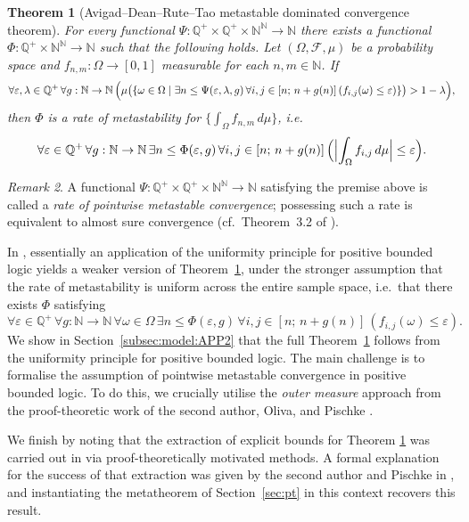 \documentclass[11pt]{amsart}
\newtheorem{theorem}{Theorem}[section]
\theoremstyle{definition}
\theoremstyle{remark}
\newtheorem{remark}[theorem]{Remark}
\def\NN{\mathbb{N}}
\def\QQ{\mathbb{Q}}
\begin{document}
\begin{theorem}[Avigad--Dean--Rute--Tao metastable dominated convergence theorem]
\label{thrm:avigad:dominated}
For every functional $\Psi\colon\QQ^+\times\QQ^+\times\NN^\NN\to\NN$ there
exists a functional $\Phi\colon\QQ^+\times\NN^\NN\to\NN$ such that the
following holds. Let $(\Omega,\mathcal{F},\mu)$ be a probability space and
$f_{n,m}\colon\Omega\to[0,1]$ measurable for each $n,m\in\NN$. If
\[
  \forall \varepsilon,\lambda \in \QQ^+\,\forall g:\NN\to\NN\,
  \Bigl(\mu\bigl(\{\omega\in\Omega\mid \exists n \le \Psi(\varepsilon,\lambda,g)\,
  \forall i,j\in[n;\,n+g(n)]\,(f_{i,j}(\omega)\le\varepsilon)\}\bigr)
  > 1-\lambda\Bigr),
\]
then $\Phi$ is a rate of metastability for $\bigl\{\int_\Omega
f_{n,m}\,d\mu\bigr\}$, i.e.\
\[
  \forall \varepsilon \in \QQ^+\,\forall g:\NN\to\NN\,
  \exists n \le \Phi(\varepsilon,g)\,\forall i,j\in[n;\,n+g(n)]\,
  \Bigl(\Bigl|\int_\Omega f_{i,j}\,d\mu\Bigr|\le\varepsilon\Bigr).
\]
\end{theorem}

\begin{remark}
A functional $\Psi\colon\QQ^+\times\QQ^+\times\NN^\NN\to\NN$ satisfying the
premise above is called a \emph{rate of pointwise metastable convergence};
possessing such a rate is equivalent to almost sure convergence
(cf.\ Theorem~3.2 of \cite{neri-powell:pp:martingale}).
\end{remark}

In \cite{DI2017}, essentially an application of the uniformity principle for positive bounded logic yields a  weaker version of
Theorem~\ref{thrm:avigad:dominated}, under the stronger assumption that the
rate of metastability is uniform across the entire sample space, i.e.\ that
there exists $\Phi$ satisfying
\[
  \forall \varepsilon \in \QQ^+\,\forall g:\NN\to\NN\,\forall\omega\in\Omega\,
  \exists n \le \Phi(\varepsilon,g)\,\forall i,j\in[n;\,n+g(n)]\,
  (f_{i,j}(\omega)\le\varepsilon).
\]
We show in Section~\ref{subsec:model:APP2} that the full Theorem~\ref{thrm:avigad:dominated} follows from the uniformity principle for
positive bounded logic. The main challenge is to formalise the assumption of pointwise metastable convergence in positive bounded logic. To do this, we crucially utilise the \emph{outer measure} approach from the proof-theoretic work of the second author, Oliva, and Pischke \cite{NeriOlivaPischke2026}.

We finish by noting that the extraction of explicit bounds for
Theorem \ref{thrm:avigad:dominated} was carried out in
\cite{Avigad-Dean-Rute:Dominated:12} via proof-theoretically motivated
methods. A formal explanation for the success of that extraction was given
by the second author and Pischke in \cite{neri-pischke:24:formal:pub}, and instantiating the metatheorem of Section~\ref{sec:pt} in this context recovers this result. 
\end{document}
